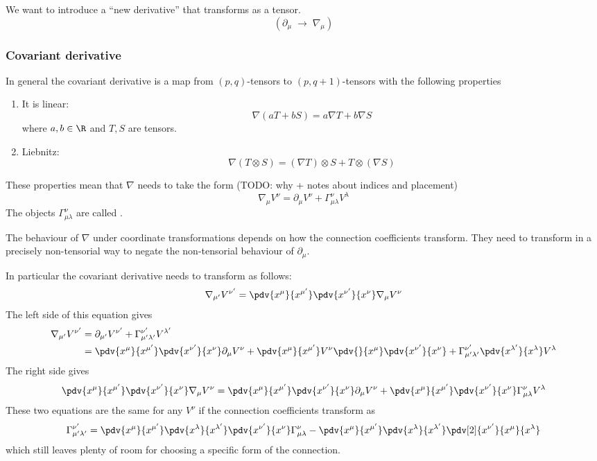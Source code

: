 We want to introduce a ``new derivative'' that transforms as a tensor.
\[ (\partial_\mu \; \to \; \nabla_\mu) \]
\subsubsection{Covariant derivative}
In general the covariant derivative is a map from $(p,q)$-tensors to $(p,q+1)$-tensors with the following properties
\begin{enumerate}
\item It is linear:
\[ \nabla(aT + bS) = a\nabla T + b\nabla S\]
where $a,b\in\R$ and $T,S$ are tensors.
\item Liebnitz:
\[ \nabla(T\otimes S) = (\nabla T) \otimes S + T \otimes (\nabla S) \]
\end{enumerate}

These properties mean that $\nabla$ needs to take the form (TODO: why + notes about indices and placement)
\[ \nabla_\mu V^\nu = \partial_\mu V^\nu + \Gamma^{\nu}_{\mu\lambda}V^\lambda \]
The objects $\Gamma^{\nu}_{\mu\lambda}$ are called .

The behaviour of $\nabla$ under coordinate transformations depends on how the connection coefficients transform. They need to transform in a precisely non-tensorial way to negate the non-tensorial behaviour of $\partial_\mu$.

In particular the covariant derivative needs to transform as follows:
\[ \nabla_{\mu'}V^{\nu'} = \pdv{x^\mu}{x^{\mu'}}\pdv{x^{\nu'}}{x^\nu}\nabla_\mu V^\nu \]
The left side of this equation gives
\begin{align*}
\nabla_{\mu'}V^{\nu'} &= \partial_{\mu'}V^{\nu'} + \Gamma^{\nu'}_{\mu'\lambda'}V^{\lambda'} \\
&= \pdv{x^\mu}{x^{\mu'}}\pdv{x^{\nu'}}{x^\nu}\partial_\mu V^\nu + \pdv{x^\mu}{x^{\mu'}}V^\nu \pdv{}{x^\mu}\pdv{x^{\nu'}}{x^\nu} + \Gamma^{\nu'}_{\mu'\lambda'} \pdv{x^{\lambda'}}{x^\lambda}V^\lambda
\end{align*}
The right side gives
\[ \pdv{x^\mu}{x^{\mu'}}\pdv{x^{\nu'}}{x^\nu}\nabla_\mu V^\nu = \pdv{x^\mu}{x^{\mu'}}\pdv{x^{\nu'}}{x^\nu}\partial_\mu V^\nu + \pdv{x^\mu}{x^{\mu'}}\pdv{x^{\nu'}}{x^\nu}\Gamma^\nu_{\mu\lambda} V^\lambda \]
These two equations are the same for any $V^\nu$ if the connection coefficients transform as
\[ \Gamma^{\nu'}_{\mu'\lambda'} = \pdv{x^\mu}{x^{\mu'}}\pdv{x^\lambda}{x^{\lambda'}}\pdv{x^{\nu'}}{x^\nu}\Gamma^\nu_{\mu\lambda} - \pdv{x^\mu}{x^{\mu'}}\pdv{x^\lambda}{x^{\lambda'}}\pdv[2]{x^{\nu'}}{x^\mu}{x^\lambda} \]
which still leaves plenty of room for choosing a specific form of the connection.

